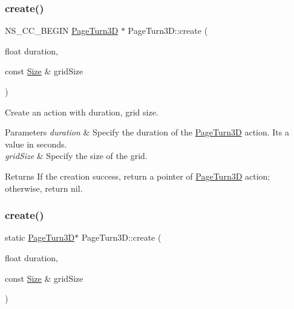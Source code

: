 \subsubsection{\texorpdfstring{create()}{create()}\hspace{0.1cm}{\footnotesize\ttfamily [1/2]}}
{\footnotesize\ttfamily N\+S\+\_\+\+C\+C\+\_\+\+B\+E\+G\+IN \hyperlink{classPageTurn3D}{Page\+Turn3D} $\ast$ Page\+Turn3\+D\+::create (\begin{DoxyParamCaption}\item[{float}]{duration,  }\item[{const \hyperlink{classSize}{Size} \&}]{grid\+Size }\end{DoxyParamCaption})\hspace{0.3cm}{\ttfamily [static]}}



Create an action with duration, grid size. 


\begin{DoxyParams}{Parameters}
{\em duration} & Specify the duration of the \hyperlink{classPageTurn3D}{Page\+Turn3D} action. It\textquotesingle{}s a value in seconds. \\
\hline
{\em grid\+Size} & Specify the size of the grid. \\
\hline
\end{DoxyParams}
\begin{DoxyReturn}{Returns}
If the creation success, return a pointer of \hyperlink{classPageTurn3D}{Page\+Turn3D} action; otherwise, return nil. 
\end{DoxyReturn}
\mbox{\label{classPageTurn3D_a627e22ddcf38209e8bc6f6b03146d423}} 
\subsubsection{\texorpdfstring{create()}{create()}\hspace{0.1cm}{\footnotesize\ttfamily [2/2]}}
{\footnotesize\ttfamily static \hyperlink{classPageTurn3D}{Page\+Turn3D}$\ast$ Page\+Turn3\+D\+::create (\begin{DoxyParamCaption}\item[{float}]{duration,  }\item[{const \hyperlink{classSize}{Size} \&}]{grid\+Size }\end{DoxyParamCaption})\hspace{0.3cm}{\ttfamily [static]}}



